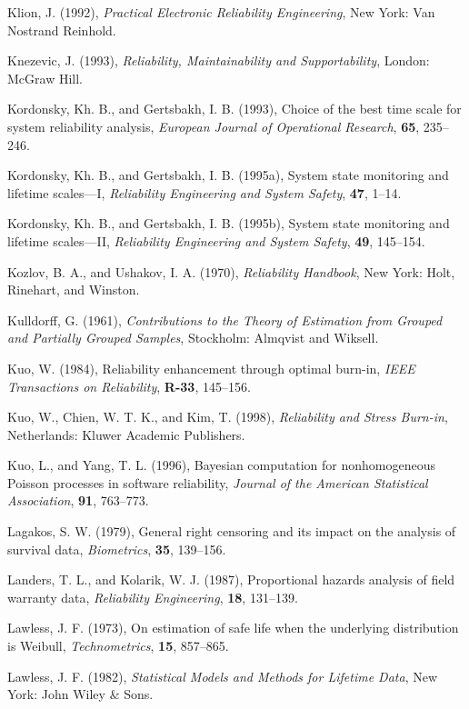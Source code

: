 \begin{thebibliography}{999}
Klion, J. (1992), {\em Practical Electronic Reliability Engineering},
New York: Van Nostrand Reinhold.

Knezevic, J. (1993), {\em Reliability, Maintainability and
Supportability}, London: McGraw Hill.

Kordonsky, Kh. B., and Gertsbakh, I. B. (1993), Choice of the best
time scale for system reliability analysis, {\em European Journal of
Operational Research}, {\bf 65}, 235--246.

Kordonsky, Kh. B., and Gertsbakh, I. B. (1995a), System state
monitoring and lifetime scales---I, {\em Reliability Engineering and
System Safety}, {\bf 47}, 1--14.

Kordonsky, Kh. B., and Gertsbakh, I. B. (1995b), System state
monitoring and lifetime scales---II, {\em Reliability Engineering and
System Safety}, {\bf 49}, 145--154.

Kozlov, B. A., and Ushakov, I. A. (1970), {\em Reliability
Handbook}, New York: Holt, Rinehart, and Winston.

Kulldorff, G. (1961), {\em Contributions to the Theory of Estimation
from Grouped and Partially Grouped Samples}, Stockholm: Almqvist and
Wiksell.

Kuo, W. (1984), Reliability enhancement through optimal burn-in,
{\em IEEE Transactions on Reliability}, {\bf R-33}, 145--156.


Kuo, W., Chien, W. T. K., and Kim, T. (1998),
{\em Reliability and Stress Burn-in},
Netherlands: Kluwer Academic Publishers.

Kuo, L., and Yang, T. L. (1996), Bayesian computation for
nonhomogeneous Poisson processes in software reliability, {\em
Journal of the American Statistical Association}, {\bf 91}, 763--773.

Lagakos, S. W. (1979), General right censoring and its impact on the
analysis of survival data, {\em Biometrics}, {\bf 35}, 139--156.

Landers, T. L., and Kolarik, W. J. (1987),
Proportional hazards analysis of field warranty data,
{\em Reliability Engineering}, {\bf 18}, 131--139.

Lawless, J. F. (1973), On estimation of safe life when the underlying
distribution is Weibull, {\em Technometrics}, {\bf 15}, 857--865.

Lawless, J. F. (1982), {\em Statistical Models and Methods for
Lifetime Data}, New York: John Wiley \& Sons.


\end{thebibliography}
